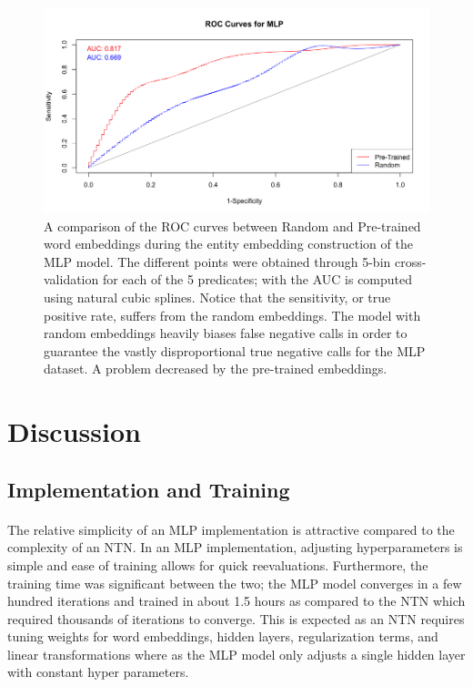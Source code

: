 \documentclass[11.5pt]{article}
\newcounter{graphics}
\begin{document}
\begin{figure}[h!]
 \includegraphics[width=1\textwidth]{report_mlp/CV-ROC.png}
  \caption{\small A comparison of the ROC curves between Random and Pre-trained word embeddings during the entity embedding construction of the MLP model. The different points were obtained through 5-bin cross-validation for each of the 5 predicates; with the AUC is computed using natural cubic splines. Notice that the sensitivity, or true positive rate, suffers from the random embeddings. The model with random embeddings heavily biases false negative calls in order to guarantee the vastly disproportional true negative calls for the MLP dataset. A problem decreased by the pre-trained embeddings.}
 \label{CV-ROC}
\end{figure}


\section{Discussion}

\subsection{Implementation and Training}
\paragraph{} The relative simplicity of an MLP implementation is attractive compared to the complexity of an NTN. In an MLP implementation, adjusting hyperparameters is simple and ease of training allows for quick reevaluations. Furthermore, the training time was significant between the two; the MLP model converges in a few hundred iterations and trained in about 1.5 hours as compared to the NTN which required thousands of iterations to converge. This is expected as an NTN requires tuning weights for word embeddings, hidden layers, regularization terms, and linear transformations where as the MLP model only adjusts a single hidden layer with constant hyper parameters.
\end{document}
